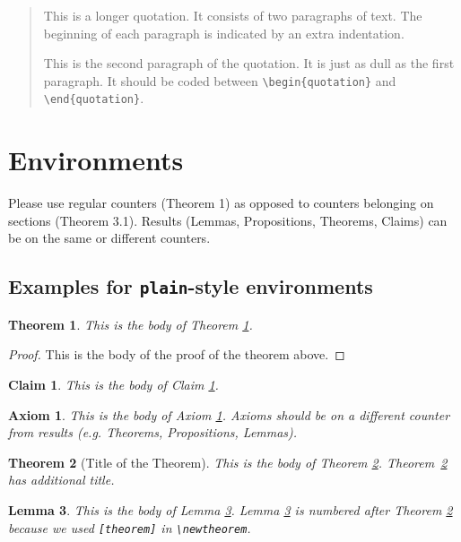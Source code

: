 \documentclass[qe,nameyear,draft]{econsocart}
\theoremstyle{plain}
\newtheorem{axiom}{Axiom}
\newtheorem{claim}{Claim}
\newtheorem{theorem}{Theorem}
\newtheorem{lemma}[theorem]{Lemma}
\theoremstyle{remark}
\begin{document}
\begin{quotation}
This is a longer quotation.  It consists of two paragraphs
of text.  The beginning of each paragraph is indicated
by an extra indentation.

This is the second paragraph of the quotation.  It is just
as dull as the first paragraph. It should be coded between \verb|\begin{quotation}| and \verb|\end{quotation}|.
\end{quotation}
\section{Environments}

Please use regular counters (Theorem 1) as opposed to counters belonging on sections (Theorem 3.1). Results (Lemmas, Propositions, Theorems, Claims) can be on the same or different counters.

\subsection{Examples for \texttt{plain}-style environments}


\begin{theorem}\label{th1}
This is the body of Theorem \ref{th1}.
\end{theorem}

\begin{proof}
This is the body of the proof of the theorem above.
\end{proof}

\begin{claim}\label{cl1}
This is the body of Claim \ref{cl1}. 
\end{claim}

\begin{axiom}\label{ax1}
This is the body of Axiom \ref{ax1}. Axioms should be on a different counter from results (e.g. Theorems, Propositions, Lemmas).
\end{axiom}

\begin{theorem}[Title of the Theorem]\label{th2}
This is the body of Theorem \ref{th2}. Theorem~\ref{th2} has additional title.
\end{theorem}

\begin{lemma}\label{le1}
This is the body of Lemma \ref{le1}. Lemma \ref{le1} is numbered after
Theorem \ref{th2} because we used \verb|[theorem]| in \verb|\newtheorem|.
\end{lemma}
\end{document}
